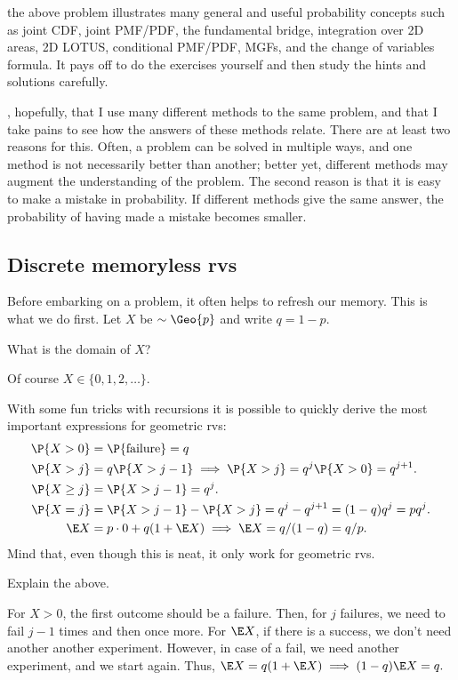 \documentclass[a4paper]{article}
\begin{document}
 the above problem illustrates many general and useful probability concepts such as  joint CDF, joint PMF/PDF, the fundamental bridge, integration over 2D areas, 2D LOTUS, conditional PMF/PDF, MGFs, and the change of variables formula. It pays off to do the exercises yourself and then study the hints and solutions carefully.

, hopefully, that I use many different methods to the same problem, and that I take pains to see how the answers of these methods relate. There are at least two reasons for this. Often, a problem can be solved in multiple ways, and one method is not necessarily better than another; better yet,  different methods may augment the understanding of the problem. The second reason is that it is easy to make a mistake in probability. If  different methods give the same answer, the probability of having made a mistake becomes smaller.
\subsection{Discrete memoryless rvs}
\label{sec:org6020ebb}
\label{sec:set-1}

Before  embarking on a problem, it often helps to  refresh our memory. This is what we do first.
Let \(X\) be \(\sim \Geo{p}\) and write \(q = 1-p\).

\begin{exercise}
What is the domain of \(X\)?
\begin{solution}
Of course \(X \in \{0, 1, 2, \ldots\}\).
\end{solution}
\end{exercise}

With some fun tricks with recursions it is possible to quickly derive the most important expressions for geometric rvs:
\begin{align*}
\P{X>0} &= \P{\textrm{failure}} = q\\
\P{X>j} &= q \P{X>j-1} \implies \P{X>j}=q^{j}\P{X>0} = q^{j+1}.\\
\P{X\geq j} &=  \P{X>j-1} = q^{j}.\\
\P{X=j} &= \P{X>j-1} - \P{X>j} = q^{j}-q^{j+1} = (1-q)q^{j} = p q^{j}.\\
\E X &= p\cdot 0 + q(1+\E X) \implies \E X = q/(1-q) = q/p.
\end{align*}
Mind that, even though this is neat, it only work for geometric rvs.

\begin{exercise}
Explain the above.
\begin{solution}
For \(X>0\), the first outcome should be a failure. Then, for \(j\) failures, we need to fail \(j-1\) times and then once more. For \(\E X\), if there is a success, we don't need another another experiment. However, in case of a fail, we need another experiment, and we start again. Thus, \(\E X = q(1+\E X) \implies (1-q)\E X = q.\)
\end{solution}
\end{exercise}
\end{document}
